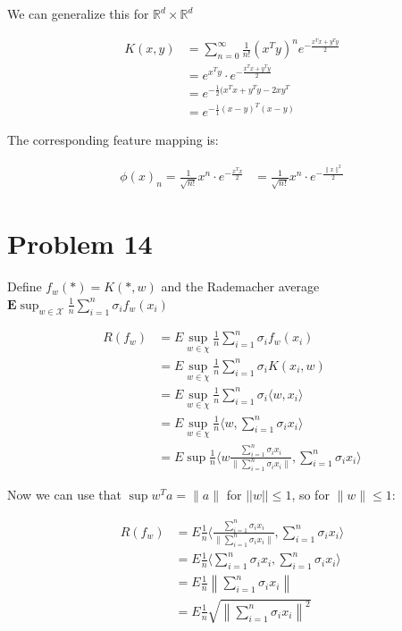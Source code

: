 \documentclass[a4paper, 11pt]{article} %
\begin{document}
We can generalize this for $\mathbb{R}^{d} \times \mathbb{R}^{d}$

\begin{align*}
K(x,y) &= \sum_{n=0}^{\infty} \frac{1}{n !}\left(x^{T} y\right)^{n} e^{-\frac{x^{T} 
x +  y^{T} y }{2}}  \\
&= e^{x^T y} \cdot e^{- \frac{x^Tx + y^Ty}{2}} \\
&= e^{- \frac{1}{2} (x^Tx + y^Ty - 2xy^T} \\
&= e^{-\frac{1}{1} (x-y)^T(x-y)}
\end{align*}

The corresponding feature mapping is:

\begin{align*}
\phi(x)_n = \frac{1}{\sqrt{n !}} x^{n} \cdot e^{-\frac{x^{T}x}{2}} 
&= \frac{1}{\sqrt{n !}} x^{n} \cdot e^{-\frac{\|x\|^{2}}{2}}
\end{align*}

\section*{Problem 14}

Define $f_w(*)  = K(*,w)$ and the Rademacher average $\mathbf{E} \sup _{w \in \mathcal{X}} \frac{1}{n} \sum_{i=1}^{n} \sigma_{i} f_{w}\left(x_{i}\right)$

\begin{align*}
R(f_w) &= E  \sup_{w \in \chi} \frac{1}{n} \sum_{i=1}^n \sigma_i f_w(x_i) \\
&= E \sup_{w \in \chi} \frac{1}{n} \sum_{i=1}^n \sigma_i K(x_i,w)\\
&= E \sup_{w \in \chi} \frac{1}{n} \sum_{i=1}^n \sigma_i \langle w, x_i\rangle \\
&= E \sup_{w \in \chi} \frac{1}{n} \langle w, \sum_{i=1}^n \sigma_i x_i \rangle \\
&= E \sup \frac{1}{n} \langle w \frac{\sum_{i=1}^n \sigma_i x_i}{\| \sum_{i=1}^n \sigma_i x_i \| },  \sum_{i=1}^n \sigma_i x_i \rangle
\end{align*}

Now we can use that $\sup w^T a = \| a \|$ for $||w|| \leq 1$, so for $\| w \| \leq 1$:

\begin{align*}
R(f_w) &= E \frac{1}{n} \langle  \frac{\sum_{i=1}^n \sigma_i x_i}{\| \sum_{i=1}^n \sigma_i x_i \| },  \sum_{i=1}^n \sigma_i x_i \rangle \\
&= E \frac{1}{n} \langle  \sum_{i=1}^n \sigma_i x_i ,  \sum_{i=1}^n \sigma_i x_i  \rangle \\
&= E\frac{1}{n}\left\|\sum_{i=1}^{n} \sigma_{i} x_{i}\right\| \\
&= E\frac{1}{n} \sqrt{\left\|\sum_{i=1}^{n} \sigma_{i} x_{i}\right\|^2 }
\end{align*}
\end{document}
